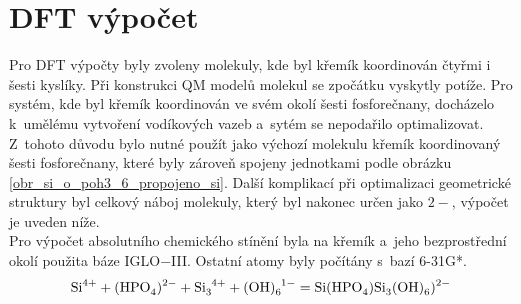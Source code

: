\documentclass[
  printed, %
  table,   %
  lof,     %
  lot,     %
  oneside,
]{fithesis3}
\begin{document}
\begin{figure}
\begin{center}
\label{obr_sio3p_vysledky_I}\end{center}
\end{figure} 
  
\section{DFT výpočet} \label{kapitola_DFT}
Pro DFT výpočty byly zvoleny molekuly, kde byl křemík koordinován čtyřmi i šesti kyslíky. Při konstrukci QM modelů molekul se zpočátku vyskytly potíže. Pro systém, kde byl křemík koordinován ve svém okolí šesti fosforečnany, docházelo k~umělému vytvoření vodíkových vazeb a~sytém se nepodařilo optimalizovat. Z~tohoto důvodu bylo nutné použít jako výchozí molekulu křemík koordinovaný šesti fosforečnany, které byly zároveň spojeny jednotkami  podle obrázku \ref{obr_si_o_poh3_6_propojeno_si}. Další komplikací při optimalizaci geometrické struktury byl celkový náboj molekuly, který byl nakonec určen jako $2-$, výpočet je uveden níže. \\
Pro výpočet absolutního chemického stínění byla na křemík a~jeho bezprostřední okolí použita báze IGLO$-$III. Ostatní atomy byly počítány s~bazí 6-31G*. 
\begin{displaymath}
\ce{Si}^{4+} + \ce{(HPO4)^{2-}} + \ce{Si3^{4+}} + \ce{(OH)6^1-} = \ce{Si(HPO4)Si3(OH)6)^{2-}}
\end{displaymath}
\end{document}

